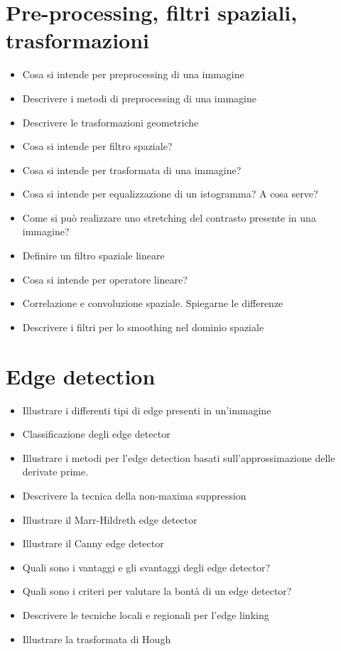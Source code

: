 \section{Pre-processing, filtri spaziali, trasformazioni}
\begin{itemize}
	\item Cosa si intende per preprocessing di una immagine
	\item Descrivere i metodi di preprocessing di una immagine
	\item Descrivere le trasformazioni geometriche
	\item Cosa si intende per filtro spaziale?
	\item Cosa si intende per trasformata di una immagine?
	\item Cosa si intende per equalizzazione di un istogramma? A cosa serve?
	\item Come si può realizzare uno stretching del contrasto presente in una immagine?
	\item Definire un filtro spaziale lineare
	\item Cosa si intende per operatore lineare?
	\item Correlazione e convoluzione spaziale. Spiegarne le differenze
	\item Descrivere i filtri per lo smoothing nel dominio spaziale
\end{itemize}

\section{Edge detection}
\begin{itemize}
	\item Illustrare i differenti tipi di edge presenti in un’immagine
	\item Classificazione degli edge detector
	\item Illustrare i metodi per l’edge detection basati sull’approssimazione delle derivate prime.
	\item Descrivere la tecnica della non-maxima suppression
	\item Illustrare il Marr-Hildreth edge detector
	\item Illustrare il Canny edge detector
	\item Quali sono i vantaggi e gli svantaggi degli edge detector?
	\item Quali sono i criteri per valutare la bontà di un edge detector?
	\item Descrivere le tecniche locali e regionali per l’edge linking
	\item Illustrare la trasformata di Hough
\end{itemize}


